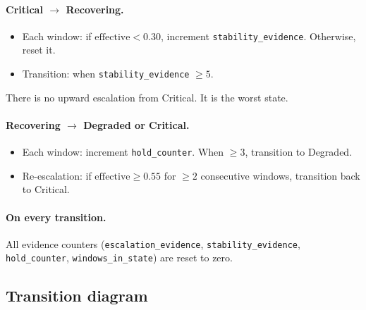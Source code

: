 \documentclass[11pt]{article}
\begin{document}
\paragraph{Critical $\rightarrow$ Recovering.}
\begin{itemize}[nosep]
  \item Each window: if $\text{effective} < 0.30$, increment
        \texttt{stability\_evidence}. Otherwise, reset it.
  \item Transition: when \texttt{stability\_evidence} $\geq 5$.
\end{itemize}
There is no upward escalation from Critical. It is the worst state.

\paragraph{Recovering $\rightarrow$ Degraded or Critical.}
\begin{itemize}[nosep]
  \item Each window: increment \texttt{hold\_counter}. When $\geq 3$,
        transition to Degraded.
  \item Re-escalation: if $\text{effective} \geq 0.55$ for $\geq 2$
        consecutive windows, transition back to Critical.
\end{itemize}

\paragraph{On every transition.}
All evidence counters (\texttt{escalation\_evidence},
\texttt{stability\_evidence}, \texttt{hold\_counter},
\texttt{windows\_in\_state}) are reset to zero.

\subsection{Transition diagram}
\end{document}
